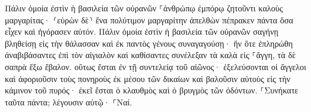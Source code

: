\documentclass{openreader}
\begin{document}
Πάλιν ὁμοία ἐστὶν ἡ βασιλεία τῶν οὐρανῶν ⸀ἀνθρώπῳ ἐμπόρῳ ζητοῦντι καλοὺς μαργαρίτας· 
⸂εὑρὼν δὲ⸃ ἕνα πολύτιμον μαργαρίτην ἀπελθὼν πέπρακεν πάντα ὅσα εἶχεν καὶ ἠγόρασεν αὐτόν. 
Πάλιν ὁμοία ἐστὶν ἡ βασιλεία τῶν οὐρανῶν σαγήνῃ βληθείσῃ εἰς τὴν θάλασσαν καὶ ἐκ παντὸς γένους συναγαγούσῃ· 
ἣν ὅτε ἐπληρώθη ἀναβιβάσαντες ἐπὶ τὸν αἰγιαλὸν καὶ καθίσαντες συνέλεξαν τὰ καλὰ εἰς ⸀ἄγγη, τὰ δὲ σαπρὰ ἔξω ἔβαλον. 
οὕτως ἔσται ἐν τῇ συντελείᾳ τοῦ αἰῶνος· ἐξελεύσονται οἱ ἄγγελοι καὶ ἀφοριοῦσιν τοὺς πονηροὺς ἐκ μέσου τῶν δικαίων 
καὶ βαλοῦσιν αὐτοὺς εἰς τὴν κάμινον τοῦ πυρός· ἐκεῖ ἔσται ὁ κλαυθμὸς καὶ ὁ βρυγμὸς τῶν ὀδόντων. 
⸀Συνήκατε ταῦτα πάντα; λέγουσιν αὐτῷ· ⸀Ναί. 
\end{document}
